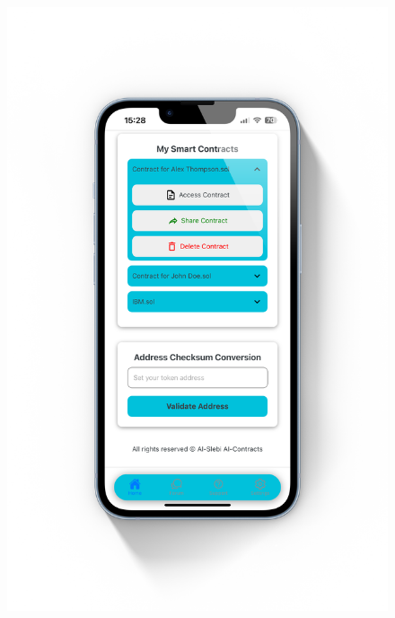 \begin{figure}[!ht]
\begin{minipage}{0.5\textwidth}
        \includegraphics[scale=0.08]{LATEX/Appendices/Images/Software/Frontend/home_screen_2.png}
        \label{fig:home screen 2}
    \end{minipage}
\end{figure}

